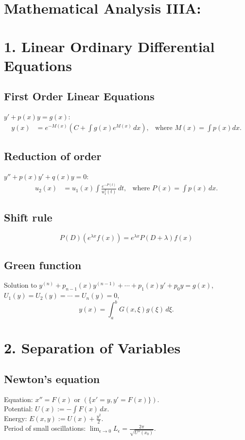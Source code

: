 \section*{Mathematical Analysis IIIA:}


\section*{1. Linear Ordinary Differential Equations}

\subsection*{First Order Linear Equations}
$y'+p(x)y=g(x)$:
\begin{align*}
 y(x) &= e^{-M(x)}\left(C+\int g(x) e^{M(x)}\, dx\right),
 & \text{where } M(x) = \int p(x) dx.
\end{align*}

\subsection*{Reduction of order}
$y'' + p(x)y' + q(x)y=0$:
\begin{align*}
 u_2(x)&= u_1(x) \int \frac{e^{-P(t)}}{u_1^2(t)}\, dt, 
&\text{where } P(x) =  \int p(x)\, dx.
\end{align*}

\subsection*{Shift rule}
\[
    P(D) (e^{\lambda x}f(x)) = e^{\lambda x}P(D+\lambda)f(x)
\]
 
\subsection*{Green function}
Solution to $y^{(n)} + p_{n-1}(x)y^{(n-1)}+\cdots+p_1(x)y'+p_0y=g(x)$,
$U_1(y)=U_2(y)=\cdots=U_n(y)=0$,
\[
  y(x) = \int_a^b G(x,\xi) g(\xi)\, d\xi.
  \]

\section*{2. Separation of Variables}

\subsection*{Newton's equation}
Equation: $x''=F(x)$ or  $(\{x'=y,y'=F(x)\})$.\\
Potential: $U(x) := -\int F(x)\, dx$.\\
Energy: $E(x,y) := U(x) + \frac {y^2}2$.\\
Period of small oscillations: $\lim_{\epsilon \to 0} L_\epsilon = 
\frac{2\pi}{\sqrt{U''(x_0)}}$.

